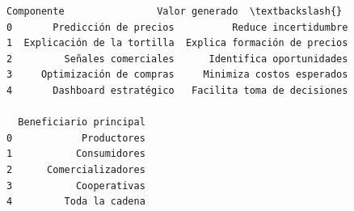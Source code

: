 \documentclass[11pt]{article}
\makeatletter
\newcommand{\boxspacing}{\kern\kvtcb@left@rule\kern\kvtcb@boxsep}
\newcommand{\prompt}[4]{
        {\ttfamily\llap{{\color{#2}[#3]:\hspace{3pt}#4}}\vspace{-\baselineskip}}
    }
\makeatother
\begin{document}
            \begin{tcolorbox}[breakable, size=fbox, boxrule=.5pt, pad at break*=1mm, opacityfill=0]
\prompt{Out}{outcolor}{321}{\boxspacing}
\begin{Verbatim}[commandchars=\\\{\}]
                   Componente                Valor generado  \textbackslash{}
0       Predicción de precios          Reduce incertidumbre
1  Explicación de la tortilla  Explica formación de precios
2         Señales comerciales      Identifica oportunidades
3     Optimización de compras     Minimiza costos esperados
4       Dashboard estratégico   Facilita toma de decisiones

  Beneficiario principal
0            Productores
1           Consumidores
2      Comercializadores
3           Cooperativas
4         Toda la cadena
\end{Verbatim}
\end{tcolorbox}
        
\end{document}

